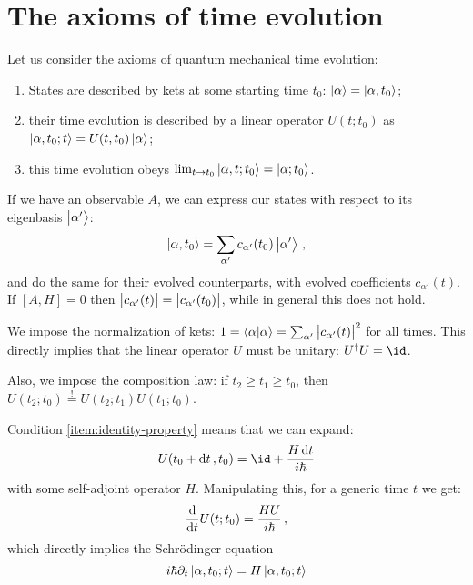 \documentclass[main.tex]{subfiles}
\begin{document}
\section{The axioms of time evolution}

Let us consider the axioms of quantum mechanical time evolution:

\begin{enumerate}
    \item States are described by kets at some starting time \(t_0\): \(\ket{\alpha} = \ket{\alpha, t_0}\);
    \item their time evolution is described by a linear operator \(U(t; t_0)\) as \(\ket{\alpha, t_0 ; t} = U(t, t_0) \ket{\alpha}\);
    \item this time evolution obeys \(\lim_{t \rightarrow t_0} \ket{\alpha, t;t_0}  = \ket{\alpha; t_0} \). \label{item:identity-property}
\end{enumerate}

If we have an observable \(A\), we can express our states with respect to its  eigenbasis \(\ket{\alpha'} \):
%
\begin{equation}
  \ket{\alpha, t_0} = \sum _{\alpha'} c_{\alpha'} (t_0) \ket{\alpha'}\,,
\end{equation}
and do the same for their evolved counterparts, with evolved coefficients \(c_{\alpha'}(t)\).
If \([A, H]=0\) then \(\abs{c_{\alpha'}(t)} = \abs{c_{\alpha'}(t_0)} \), while in general this does not hold.

We impose the normalization of kets: \(1 = \braket{\alpha}{\alpha} = \sum _{\alpha'} \abs{c_{\alpha'}(t)}^2 \) for all times. This directly implies that the linear operator \(U\) must be unitary: \(U^\dag U = \id\).

Also, we impose the composition law: if \(t_2 \geq t_1 \geq t_0\), then \(U(t_2;t_0) \overset{!}{=} U(t_2;t_1) U(t_1;t_0)\).

Condition \ref{item:identity-property} means that we can expand:
%
\begin{equation}
  U(t_0 + \dd{t}, t_0) = \id + \frac{H \dd{t}}{i \hbar}
\end{equation}
%
with some self-adjoint operator \(H\).
Manipulating this, for a generic time \(t\) we get:
%
\begin{equation}
  \dv{}{t} U(t;t_0) = \frac{HU}{i \hbar} \,,
\end{equation}
%
which directly implies the Schrödinger equation
%
\begin{equation}
  i \hbar \partial_t \ket{\alpha, t_0; t} = H \ket{\alpha, t_0; t}
\end{equation}
\end{document}
